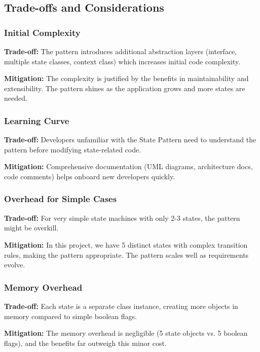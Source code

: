 \documentclass[11pt,a4paper]{article}
\begin{document}
\subsection{Trade-offs and Considerations}

\subsubsection{Initial Complexity}

\textbf{Trade-off:} The pattern introduces additional abstraction layers (interface, multiple state classes, context class) which increases initial code complexity.

\textbf{Mitigation:} The complexity is justified by the benefits in maintainability and extensibility. The pattern shines as the application grows and more states are needed.

\subsubsection{Learning Curve}

\textbf{Trade-off:} Developers unfamiliar with the State Pattern need to understand the pattern before modifying state-related code.

\textbf{Mitigation:} Comprehensive documentation (UML diagrams, architecture docs, code comments) helps onboard new developers quickly.

\subsubsection{Overhead for Simple Cases}

\textbf{Trade-off:} For very simple state machines with only 2-3 states, the pattern might be overkill.

\textbf{Mitigation:} In this project, we have 5 distinct states with complex transition rules, making the pattern appropriate. The pattern scales well as requirements evolve.

\subsubsection{Memory Overhead}

\textbf{Trade-off:} Each state is a separate class instance, creating more objects in memory compared to simple boolean flags.

\textbf{Mitigation:} The memory overhead is negligible (5 state objects vs. 5 boolean flags), and the benefits far outweigh this minor cost.
\end{document}
